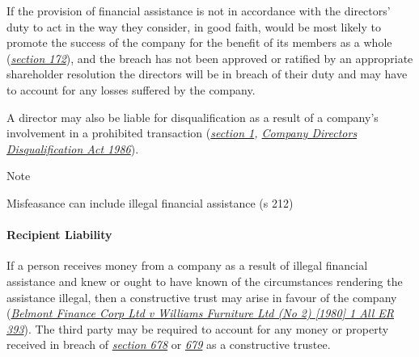 \documentclass[
]{article}
\newenvironment{env-486fc4cd-eb32-4215-aaa2-fc77a67eebc5}
{
    \savenotes\tcolorbox[blanker,breakable,left=5pt,borderline west={2pt}{-4pt}{blue}]
}
{
    \endtcolorbox\spewnotes
}
\begin{document}
If the provision of financial assistance is not in accordance with the
directors' duty to act in the way they consider, in good faith, would be
most likely to promote the success of the company for the benefit of its
members as a whole
(\emph{\href{https://uk.westlaw.com/5-505-5377?originationContext=document\&transitionType=PLDocumentLink\&contextData=(sc.Default)\&ppcid=fc9f4d9e83af4b4c8d47bf5847a3205c}{section
172}}), and the breach has not been approved or ratified by an
appropriate shareholder resolution the directors will be in breach of
their duty and may have to account for any losses suffered by the
company.

A director may also be liable for disqualification as a result of a
company's involvement in a prohibited transaction
(\emph{\href{https://uk.westlaw.com/5-506-8501?originationContext=document\&transitionType=PLDocumentLink\&contextData=(sc.Default)\&ppcid=fc9f4d9e83af4b4c8d47bf5847a3205c}{section
1},
\href{https://uk.westlaw.com/4-505-7796?originationContext=document\&transitionType=PLDocumentLink\&contextData=(sc.Default)\&ppcid=fc9f4d9e83af4b4c8d47bf5847a3205c}{Company
Directors Disqualification Act 1986}}).

\begin{env-486fc4cd-eb32-4215-aaa2-fc77a67eebc5}

Note

Misfeasance can include illegal financial assistance (s 212)

\end{env-486fc4cd-eb32-4215-aaa2-fc77a67eebc5}

\hypertarget{recipient-liability}{%
\paragraph{Recipient Liability}\label{recipient-liability}}

If a person receives money from a company as a result of illegal
financial assistance and knew or ought to have known of the
circumstances rendering the assistance illegal, then a constructive
trust may arise in favour of the company
(\emph{\href{https://uk.westlaw.com/D-016-7350?originationContext=document\&transitionType=PLDocumentLink\&contextData=(sc.Default)\&ppcid=fc9f4d9e83af4b4c8d47bf5847a3205c}{Belmont
Finance Corp Ltd v Williams Furniture Ltd (No 2) {[}1980{]} 1 All ER
393}}). The third party may be required to account for any money or
property received in breach of
\emph{\href{https://uk.westlaw.com/5-505-7258?originationContext=document\&transitionType=PLDocumentLink\&contextData=(sc.Default)\&ppcid=fc9f4d9e83af4b4c8d47bf5847a3205c}{section
678}} or
\emph{\href{https://uk.westlaw.com/6-506-2056?originationContext=document\&transitionType=PLDocumentLink\&contextData=(sc.Default)\&ppcid=fc9f4d9e83af4b4c8d47bf5847a3205c}{679}}
as a constructive trustee.
\end{document}
